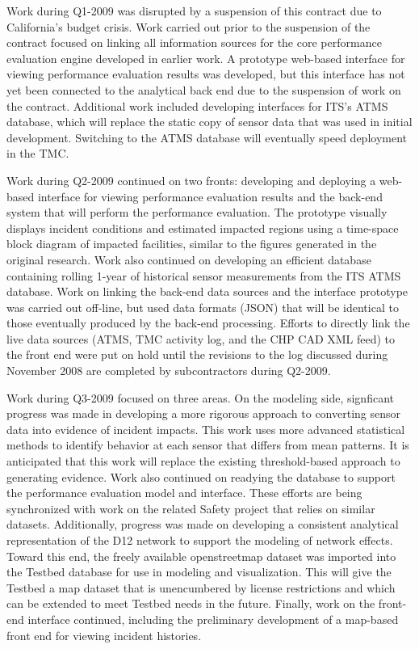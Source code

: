Work during Q1-2009 was disrupted by a suspension of this contract due to
California's budget crisis.  Work carried out prior to the suspension of the
contract focused on linking all information sources for the core performance
evaluation engine developed in earlier work.  A prototype web-based interface
for viewing performance evaluation results was developed, but this interface has
not yet been connected to the analytical back end due to the suspension of work
on the contract.  Additional work included developing interfaces for ITS's ATMS
database, which will replace the static copy of sensor data that was used in
initial development. Switching to the ATMS database will eventually speed
deployment in the TMC.

Work during Q2-2009 continued on two fronts: developing and deploying a
web-based interface for viewing performance evaluation results and the back-end
system that will perform the performance evaluation. The prototype visually
displays incident conditions and estimated impacted regions using a time-space
block diagram of impacted facilities, similar to the figures generated in the
original research. Work also continued on developing an efficient database
containing rolling 1-year of historical sensor measurements from the ITS ATMS
database. Work on linking the back-end data sources and the interface prototype
was carried out off-line, but used data formats (JSON) that will be identical to
those eventually produced by the back-end processing. Efforts to directly link
the live data sources (ATMS, TMC activity log, and the CHP CAD XML feed) to the
front end were put on hold until the revisions to the log discussed during
November 2008 are completed by subcontractors during Q2-2009.

Work during Q3-2009 focused on three areas.  On the modeling side, signficant
progress was made in developing a more rigorous approach to converting sensor
data into evidence of incident impacts.  This work uses more advanced
statistical methods to identify behavior at each sensor that differs from mean
patterns.  It is anticipated that this work will replace the existing
threshold-based approach to generating evidence.  Work also continued on
readying the database to support the performance evaluation model and interface.
These efforts are being synchronized with work on the related Safety project
that relies on similar datasets.  Additionally, progress was made on developing
a consistent analytical representation of the D12 network to support the
modeling of network effects.  Toward this end, the freely available
openstreetmap dataset was imported into the Testbed database for use in modeling
and visualization.  This will give the Testbed a map dataset that is
unencumbered by license restrictions and which can be extended to meet Testbed
needs in the future.  Finally, work on the front-end interface continued,
including the preliminary development of a map-based front end for viewing
incident histories.

